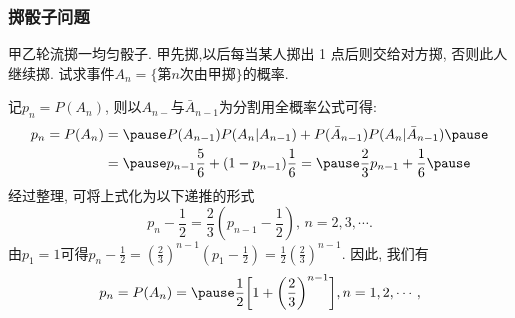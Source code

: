 %
%
%






\begin{frame}
  \frametitle{掷骰子问题}
  \begin{exam}
   甲乙轮流掷一均匀骰子. 甲先掷,以后每当某人掷出 1 点后则交给对方掷, 否则此人继续掷. 试求事件$A_n=\{\mbox{第}n\mbox{次由甲掷}\}$的概率.
  \end{exam}

  \pause
\jieda 记$p_n=P(A_n)$, 则以$A_{n-}$与$\bar{A}_{n-1}$为分割用全概率公式可得:\pause
\begin{align*}
  p_n=P(A_n)&=\pause P(A_{n-1})P(A_n|A_{n-1})+P(\bar{A}_{n-1})P(A_n|\bar{A}_{n-1})\pause\\
            &=\pause p_{n-1}\dfrac{5}{6}+(1-p_{n-1})\dfrac{1}{6}=\pause \dfrac{2}{3}p_{n-1}+\dfrac{1}{6}\pause
\end{align*}
 经过整理, 可将上式化为以下递推的形式\pause
$$p_n-\frac{1}{2}=\frac{2}{3}\left(p_{n-1}-\frac{1}{2}\right),\,n=2,3,\cdots.$$\pause
由$p_1=1$可得$p_n-\frac{1}{2}=\left(\frac{2}{3}\right)^{n-1}\left(p_1-\frac{1}{2}\right)=\frac{1}{2}\left(\frac{2}{3}\right)^{n-1}.$
\pause 因此, 我们有\pause
\begin{eqnarray*}
  p_n=P(A_n)=\pause\dfrac{1}{2}\bigg[1+\bigg(\dfrac{2}{3}\bigg)^{n-1}\bigg], n=1,2, \cdots,
\end{eqnarray*}

\end{frame}




